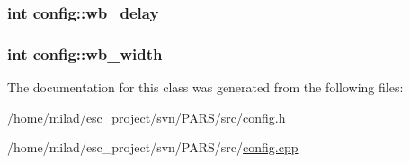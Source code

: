 \label{classconfig_a56fb441e18e865131359adfc0ea56c2a}
\hypertarget{classconfig_a19565b08815a3a80c62393a062255225}{
\subsubsection[{wb\_\-delay}]{\setlength{\rightskip}{0pt plus 5cm}int {\bf config::wb\_\-delay}}}
\label{classconfig_a19565b08815a3a80c62393a062255225}
\hypertarget{classconfig_a9ef7bd3b551d8830a5f9ef3ea8981324}{
\subsubsection[{wb\_\-width}]{\setlength{\rightskip}{0pt plus 5cm}int {\bf config::wb\_\-width}}}
\label{classconfig_a9ef7bd3b551d8830a5f9ef3ea8981324}


The documentation for this class was generated from the following files:\begin{DoxyCompactItemize}
\item 
/home/milad/esc\_\-project/svn/PARS/src/\hyperlink{config_8h}{config.h}\item 
/home/milad/esc\_\-project/svn/PARS/src/\hyperlink{config_8cpp}{config.cpp}\end{DoxyCompactItemize}
